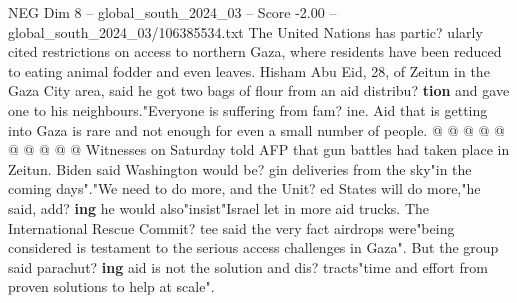 \begin{textsample}{NEG Dim 8 – global\_south\_2024\_03 – Score -2.00 – global\_south\_2024\_03/106385534.txt}
The United Nations has partic? ularly cited restrictions on access to northern Gaza, where residents have been reduced to eating animal fodder and even leaves.
Hisham Abu Eid, 28, of Zeitun in the Gaza City area, said he got two bags of flour from an aid distribu? \textbf{tion} and gave one to his neighbours."Everyone is suffering from fam? ine.
Aid that is getting into Gaza is rare and not enough for even a small number of people. @ @ @ @ @ @ @ @ @ @ Witnesses on Saturday told AFP that gun battles had taken place in Zeitun.
Biden said Washington would be? gin deliveries from the sky"in the coming days"."We need to do more, and the Unit? ed States will do more,"he said, add? \textbf{ing} he would also"insist"Israel let in more aid trucks.
The International Rescue Commit? tee said the very fact airdrops were"being considered is testament to the serious access challenges in Gaza".
But the group said parachut? \textbf{ing} aid is not the solution and dis? tracts"time and effort from proven solutions to help at scale".

\end{textsample}
